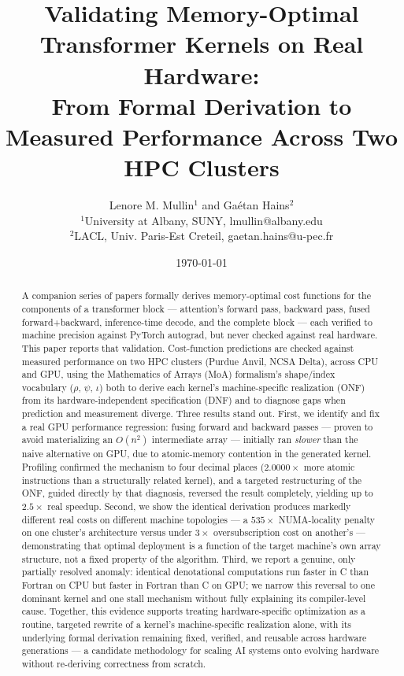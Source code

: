 \documentclass[11pt]{article}
\title{Validating Memory-Optimal Transformer Kernels on Real Hardware:\\
From Formal Derivation to Measured Performance Across Two HPC Clusters}
\author{Lenore M. Mullin$^1$ and Ga\'etan Hains$^2$\\ $^1$University at Albany, SUNY, lmullin@albany.edu\\ $^2$LACL, Univ. Paris-Est Creteil, gaetan.hains@u-pec.fr}
\date{\today}
\begin{document}
\sloppy
\maketitle

\begin{abstract}
A companion series of papers formally derives memory-optimal cost
functions for the components of a transformer block --- attention's
forward pass, backward pass, fused forward+backward, inference-time
decode, and the complete block --- each verified to machine precision
against PyTorch autograd, but never checked against real hardware. This
paper reports that validation. Cost-function predictions are checked
against measured performance on two HPC clusters (Purdue Anvil, NCSA
Delta), across CPU and GPU, using the Mathematics of Arrays (MoA)
formalism's shape/index vocabulary ($\rho$, $\psi$, $\iota$) both to
derive each kernel's machine-specific realization (ONF) from its
hardware-independent specification (DNF) and to diagnose gaps when
prediction and measurement diverge. Three results stand out. First, we
identify and fix a real GPU performance regression: fusing forward and
backward passes --- proven to avoid materializing an $O(n^2)$
intermediate array --- initially ran \emph{slower} than the naive
alternative on GPU, due to atomic-memory contention in the generated
kernel. Profiling confirmed the mechanism to four decimal places
($2.0000\times$ more atomic instructions than a structurally related
kernel), and a targeted restructuring of the ONF, guided directly by
that diagnosis, reversed the result completely, yielding up to
$2.5\times$ real speedup. Second, we show the identical derivation
produces markedly different real costs on different machine
topologies --- a $535\times$ NUMA-locality penalty on one cluster's
architecture versus under $3\times$ oversubscription cost on another's
--- demonstrating that optimal deployment is a function of the target
machine's own array structure, not a fixed property of the algorithm.
Third, we report a genuine, only partially resolved anomaly: identical
denotational computations run faster in C than Fortran on CPU but
faster in Fortran than C on GPU; we narrow this reversal to one
dominant kernel and one stall mechanism without fully explaining its
compiler-level cause. Together, this evidence supports treating
hardware-specific optimization as a routine, targeted rewrite of a
kernel's machine-specific realization alone, with its underlying formal
derivation remaining fixed, verified, and reusable across hardware
generations --- a candidate methodology for scaling AI systems onto
evolving hardware without re-deriving correctness from scratch.
\end{abstract}
\end{document}
